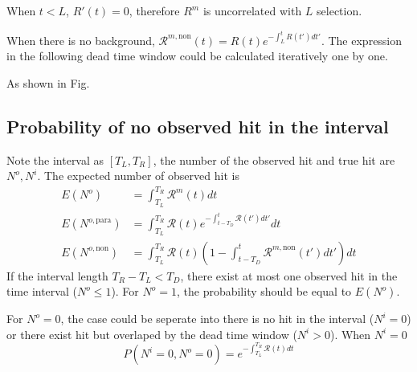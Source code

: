When $t<L$, $R'(t)=0$, therefore $R^m$ is uncorrelated with $L$ selection.

When there is no background, $\mathcal{R}^{m,\mathrm{non}}(t) = R(t)e^{-\int_{L}^{t}{R(t')dt'}}$.
The expression in the following dead time window could be calculated iteratively one by one.

As shown in Fig.

\subsection{Probability of no observed hit in the interval}
Note the interval as $[T_L, T_R]$, the number of the observed hit and true hit are $N^{o}, N^{i}$. The expected number of observed hit is 
\begin{equation}
\begin{aligned}
E(N^{o})&=\int_{T_L}^{T_R}{\mathcal{R}^m(t)dt}\\
E(N^{o,\mathrm{para}})&=\int_{T_L}^{T_R}{\mathcal{R}(t)e^{-\int_{t-T_D}^{t}{\mathcal{R}(t')dt'}}dt}\\
E(N^{o,\mathrm{non}})&=\int_{T_L}^{T_R}{\mathcal{R}(t)\left(1-\int_{t-T_D}^{t}{\mathcal{R}^{m,\mathrm{non}}(t')dt'}\right)dt}
\end{aligned}
\end{equation}
If the interval length $T_R-T_L<T_D$, there exist at most one observed hit in the time interval ($N^o\leq1$). For $N^o=1$, the probability should be equal to $E(N^o)$.

For $N^o=0$, the case could be seperate into there is no hit in the interval ($N^i=0$) or there exist hit but overlaped by the dead time window ($N^i>0$). When $N^i=0$
\begin{equation}
P(N^i=0,N^o=0)=e^{-\int_{T_L}^{T_R}{\mathcal{R}(t)dt}}
\end{equation}

